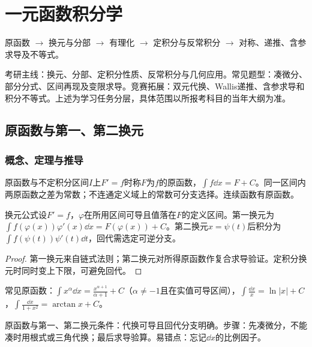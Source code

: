 \chapter{一元函数积分学}\label{ch:3}
\begin{tcolorbox}[title=章首知识地图,colframe=Ink]
原函数 $\to$ 换元与分部 $\to$ 有理化 $\to$ 定积分与反常积分 $\to$ 对称、递推、含参求导及不等式。
\end{tcolorbox}
\begin{examtip}考研主线：换元、分部、定积分性质、反常积分与几何应用。常见题型：凑微分、部分分式、区间再现及变限求导。竞赛拓展：双元代换、Wallis递推、含参求导和积分不等式。上述为学习任务分层，具体范围以所报考科目的当年大纲为准。\end{examtip}
\section{原函数与第一、第二换元}\label{sec:3:1}
\subsection{概念、定理与推导}

\begin{definition}{原函数与不定积分}区间$I$上$F\prime=f$时称$F$为$f$的原函数，$\int f\dd x=F+C$。同一区间内两原函数之差为常数；不连通定义域上的常数可分支选择。连续函数有原函数。\end{definition}
\begin{theorem}{换元公式}设$F\prime=f$，$\varphi$在所用区间可导且值落在$F$的定义区间。第一换元为$\int f(\varphi(x))\varphi\prime(x)\dd x=F(\varphi(x))+C$。第二换元$x=\psi(t)$后积分为$\int f(\psi(t))\psi\prime(t)\dd t$，回代需选定可逆分支。\end{theorem}
\begin{proof}第一换元来自链式法则；第二换元对所得原函数作复合求导验证。定积分换元时同时变上下限，可避免回代。\end{proof}
常见原函数：$\int x^\alpha\dd x=\frac{x^{\alpha+1}}{\alpha+1}+C$（$\alpha\ne-1$且在实值可导区间），$\int\frac{\dd x}{x}=\ln|x|+C$，$\int\frac{\dd x}{1+x^2}=\arctan x+C$。

\begin{method}{原函数与第一、第二换元}条件：代换可导且回代分支明确。步骤：先凑微分，不能凑时用根式或三角代换；最后求导验算。易错点：忘记$\dd x$的比例因子。\end{method}
